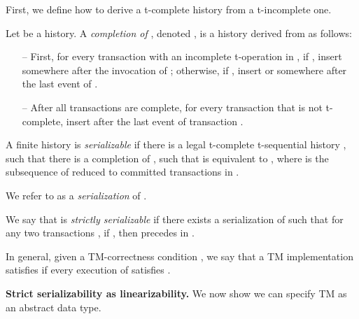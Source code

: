 First, we define how to derive a t-complete history from a t-incomplete one.
\begin{definition}[Completions]
\label{def:comp}
Let  be a history.
A \emph{completion of }, denoted ,
is a history derived from  as follows:
\begin{itemize}
\item[--]
First, for every transaction 
with an incomplete t-operation  in ,
if ,
insert  somewhere after the invocation of ;
otherwise, if ,
insert  or  somewhere after the last event of .
\item[--]
After all transactions are complete,
for every transaction  that is not t-complete,
insert  after the last event of transaction .
\end{itemize}
\end{definition}
\begin{definition}
\label{def:oser}
A finite history  is \emph{serializable} if there
is a legal t-complete t-sequential history ,
such that
there is a completion  of ,
such that  is equivalent to ,
where  is the subsequence of 
reduced to committed transactions in .


We refer to  as a \emph{serialization} of .

We say that  is \emph{strictly serializable} if there exists a serialization  of  such that
for any two transactions ,
if , then  precedes  in .
\end{definition}
In general, given a TM-correctness condition , we say that a TM implementation  satisfies  if every
execution of  satisfies .

\vspace{1mm}\noindent\textbf{Strict serializability as linearizability.}
We now show we can specify TM as an abstract data type.

